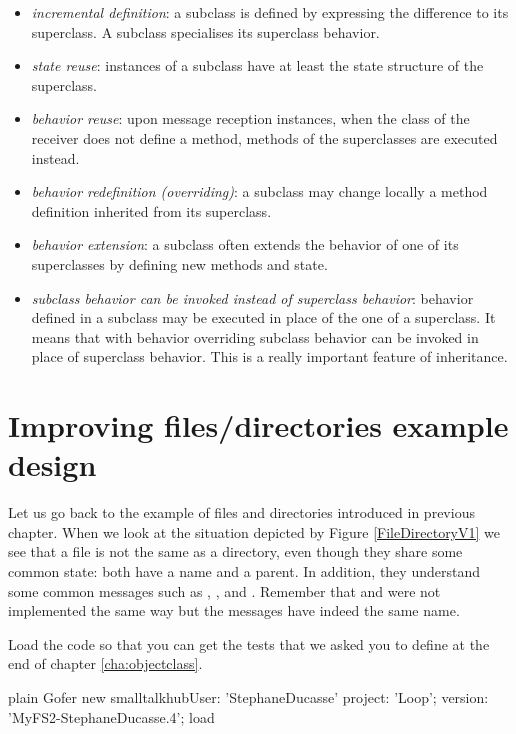 \documentclass[10pt,twoside,english]{_support/latex/sbabook/sbabook}
\begin{document}
\begin{itemize}
\item \textit{incremental definition}: a subclass is defined by expressing the difference to its superclass. A subclass specialises its superclass behavior.
\item \textit{state reuse}: instances of a subclass have at least the state structure of the superclass.
\item \textit{behavior reuse}: upon message reception instances,  when the class of the receiver does not define a method, methods of the superclasses are executed instead.
\item \textit{behavior redefinition (overriding)}: a subclass may change locally a method definition inherited from its superclass.
\item \textit{behavior extension}: a subclass often extends the behavior of one of its superclasses by defining new methods and state.
\item \textit{subclass behavior can be invoked instead of superclass behavior}: behavior defined in a subclass may be executed in place of the one of a superclass. It means that with behavior overriding subclass behavior can be invoked in place of superclass behavior. This is a really important feature of inheritance.
\end{itemize}
\section{Improving files/directories example design}
Let us go back to the example of files and directories introduced in previous chapter. 
When we look at the situation depicted by Figure \ref{FileDirectoryV1} we see that a file is not the same as a directory, even though they share some common state: both have a name and a parent. In addition, they understand some common messages such as , ,  and . Remember that  and  were not implemented the same way but the messages have indeed the same name. 

Load the code so that you can get the tests that we asked you to define at the end of chapter \ref{cha:objectclass}.

\begin{displaycode}{plain}
Gofer new
	smalltalkhubUser: 'StephaneDucasse' project: 'Loop'; 
	version: 'MyFS2-StephaneDucasse.4';
	load
\end{displaycode}
\end{document}
